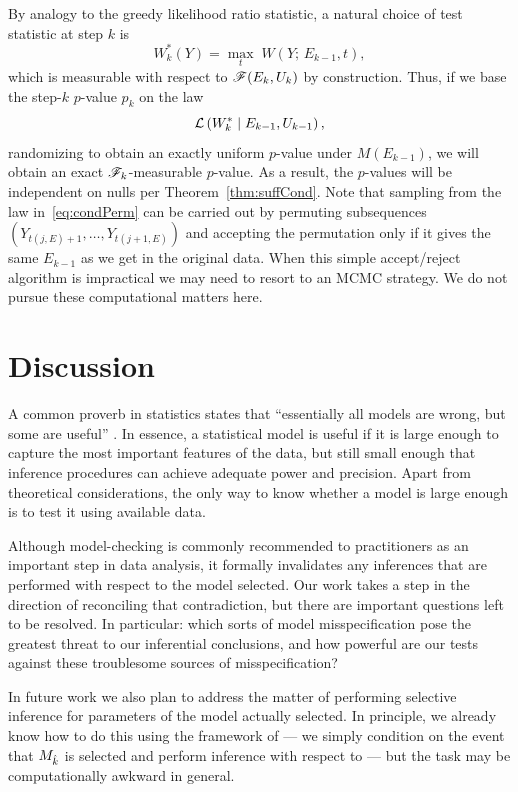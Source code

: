 \documentclass{article}
\begin{document}
By analogy to the greedy likelihood ratio statistic, a natural choice of test statistic at step $k$ is
\[
W_k^*(Y) = \max_t \; W(Y; \, E_{k-1}, t),
\]
which is measurable with respect to $\mathscr{F}(E_k, U_k)$ by construction. Thus, if we base the step-$k$ $p$-value $p_k$ on the law
\begin{equation}\label{eq:condPerm}
\mathcal{L}\left(W_k^* \mid E_{k-1}, U_{k-1}\right),
\end{equation}
randomizing to obtain an exactly uniform $p$-value under $M(E_{k-1})$, we will obtain an exact $\mathscr{F}_k$-measurable $p$-value. As a result, the $p$-values will be independent on nulls per Theorem~\ref{thm:suffCond}. Note that sampling from the law in~\eqref{eq:condPerm} can be carried out by permuting subsequences $(Y_{t(j,E)+1}, \ldots, Y_{t(j+1,E)})$ and accepting the permutation only if it gives the same $E_{k-1}$ as we get in the original data. When this simple accept/reject algorithm is impractical we may need to resort to an MCMC strategy. We do not pursue these computational matters here.

\section{Discussion}
\label{sec:discussion}

A common proverb in statistics states that ``essentially all models are wrong, but some are useful'' \citep{box1987empirical}. In essence, a statistical model is useful if it is large enough to capture the most important features of the data, but still small enough that inference procedures can achieve adequate power and precision. Apart from theoretical considerations, the only way to know whether a model is large enough is to test it using available data.

Although model-checking is commonly recommended to practitioners as an important step in data analysis, it formally invalidates any inferences that are performed with respect to the model selected. Our work takes a step in the direction of reconciling that contradiction, but there are important questions left to be resolved. In particular: which sorts of model misspecification pose the greatest threat to our inferential conclusions, and how powerful are our tests against these troublesome sources of misspecification? 

In future work we also plan to address the matter of performing selective inference for parameters of the model actually selected. In principle, we already know how to do this using the framework of \citet{fithian2014optimal} --- we simply condition on the event that $M_{\hat{k}}$ is selected and perform inference with respect to  --- but the task may be computationally awkward in general.
\end{document}
